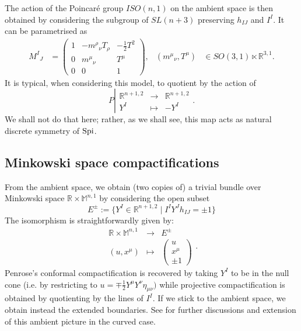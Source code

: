 \documentclass[a4paper, 10pt]{article}
\theoremstyle{remark}
\newcommand{\Spi}{\textnormal{Spi}}
\begin{document}
The action of the Poincaré group $ISO(n,1)$ on the ambient space is then obtained by considering the subgroup of $SL(n+3)$ preserving $h_{IJ}$ and $I^{I}$. It can be parametrised as
\begin{align}
    M^I {}_J &= \begin{pmatrix}
        1 & - m^{\rho}{}_{\nu} T_{\rho} & -\frac{1}{2} T^2 \\
        0 & m^{\mu}{}_{\nu} & T^{\mu}\\
        0 & 0 & 1
    \end{pmatrix}, & \left( m^{\mu}{}_{\nu} , T^{\mu}\right) &\in SO(3,1) \ltimes \mathbb{R}^{3,1}.
\end{align}
It is typical, when considering this model, to quotient by the action of
\begin{equation}\label{Appdx: ambient parity in the model}
    P \left| \begin{array}{ccc}
         \mathbb{R}^{n+1,2} & \to & \mathbb{R}^{n+1,2} \\
          Y^I & \mapsto &  - Y^I 
    \end{array}\right. .
\end{equation}
We shall not do that here; rather, as we shall see, this map acts as natural discrete symmetry of $\Spi$.

\subsection{Minkowski space compactifications}

From the ambient space, we obtain (two copies of) a trivial bundle over Minkowski space $\mathbb{R} \times \mathbb{M}^{n,1}$ by considering the open subset
\begin{equation}
   E^{\pm} := \big\{ Y^I \in \mathbb{R}^{n+1,2} \; \vert \; I^{I}  Y^{J} h_{IJ}= \pm 1 \big\}
\end{equation}
The isomorphism is straightforwardly given by:
\begin{equation}
    \begin{array}{ccc}
     \mathbb{R} \times \mathbb{M}^{n,1}  & \to &  E^{\pm}  \\
      (u , x^{\mu})    & \mapsto & \begin{pmatrix}
           u \\ x^{\mu} \\ \pm 1
      \end{pmatrix}
    \end{array}.
\end{equation}
Penrose's conformal compactification is recovered by taking $Y^I$ to be in the null cone (i.e. by restricting to $u = \mp\frac{1}{2} Y^\mu Y^{\nu} \eta_{\mu\nu})$ while projective compactification is obtained by quotienting by the lines of $I^I$. If we stick to the ambient space, we obtain instead the extended boundaries. See \cite{RSTA20230042,Borthwick:2024wfn} for further discussions and extension of this ambient picture in the curved case.
\end{document}
